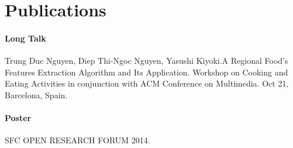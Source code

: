 \chapter*{Publications}

\subsubsection{Long Talk}

Trung Duc Nguyen, Diep Thi-Ngoc Nguyen, Yasushi Kiyoki.A Regional Food's Features Extraction Algorithm and Its Application.
Workshop on Cooking and Eating Activities in conjunction with ACM Conference on Multimedia. Oct 21, Barcelona, Spain.

\subsubsection{Poster}
SFC OPEN RESEARCH FORUM 2014.

